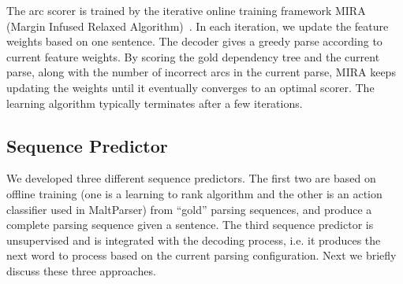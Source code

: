 The arc scorer is trained by the iterative online
training framework MIRA (Margin Infused Relaxed Algorithm)~\cite{crammer2003ultraconservative}.
In each iteration, we update the feature weights based on one sentence. The
decoder gives a greedy parse according to current feature weights.
By scoring the gold dependency tree and the current parse,
along with the number of incorrect arcs in the current parse,
MIRA keeps updating the weights until it eventually converges to an optimal scorer.
The learning algorithm typically terminates after a few iterations.

\subsection{Sequence Predictor}
We developed three different sequence predictors. The first two are based on
offline training (one is a learning to rank algorithm and the other is
an action classifier used in MaltParser) from ``gold'' parsing sequences,
and produce a complete parsing sequence given a sentence.
The third sequence predictor is unsupervised and is
integrated with the decoding process, i.e. it produces the next word to
process based on the current parsing configuration.
Next we briefly discuss these three approaches.

